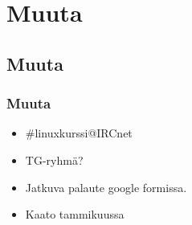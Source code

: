 \documentclass[finnish]{beamer}
\begin{document}
\section{Muuta}

\begin{frame}
    \subsection{Muuta}
    \frametitle{Muuta}
    \begin{itemize}
        \item \#linuxkurssi@IRCnet
        \item TG-ryhmä?
        \item Jatkuva palaute google formissa.
        \item Kaato tammikuussa
    \end{itemize}
\end{frame}

\end{document}
